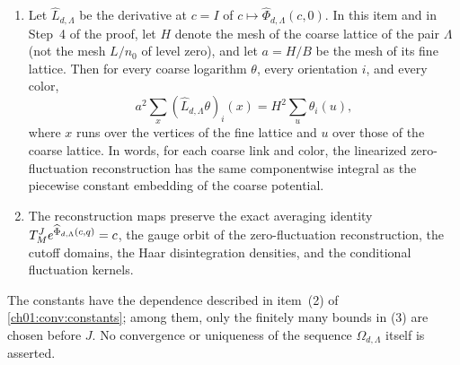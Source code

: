 \begin{theorem}
\begin{enumerate}
\item Let $\widehat L_{d,\Lambda}$ be the derivative at $c=I$ of $c\mapsto\widehat\Phi_{d,\Lambda}(c,0)$. In this item and in Step~4 of the proof, let $H$ denote the mesh of the coarse lattice of the pair $\Lambda$ (not the mesh $L/n_0$ of level zero), and let $a=H/B$ be the mesh of its fine lattice. Then for every coarse logarithm $\theta$, every orientation $i$, and every color,
\[
 a^2\sum_{x}(\widehat L_{d,\Lambda}\theta)_i(x)=H^2\sum_{u}\theta_i(u),
\]
where $x$ runs over the vertices of the fine lattice and $u$ over those of the coarse lattice. In words, for each coarse link and color, the linearized zero-fluctuation reconstruction has the same componentwise integral as the piecewise constant embedding of the coarse potential.
\item The reconstruction maps preserve the exact averaging identity $T_M^J e^{\widehat\Phi_{d,\Lambda}(c,q)}=c$, the gauge orbit of the zero-fluctuation reconstruction, the cutoff domains, the Haar disintegration densities, and the conditional fluctuation kernels.
\end{enumerate}
The constants have the dependence described in item~(2) of \cref{ch01:conv:constants}; among them, only the finitely many bounds in (3) are chosen before $J$. No convergence or uniqueness of the sequence $\Omega_{d,\Lambda}$ itself is asserted.
\end{theorem}

